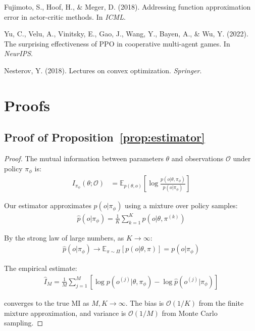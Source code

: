 \documentclass[12pt, a4paper]{article}
\begin{document}
\begin{thebibliography}{99}
Fujimoto, S., Hoof, H., \& Meger, D. (2018). Addressing function approximation error in actor-critic methods. In \textit{ICML}.

Yu, C., Velu, A., Vinitsky, E., Gao, J., Wang, Y., Bayen, A., \& Wu, Y. (2022). The surprising effectiveness of PPO in cooperative multi-agent games. In \textit{NeurIPS}.

Nesterov, Y. (2018). Lectures on convex optimization. \textit{Springer}.

\end{thebibliography}

\appendix

\section{Proofs}

\subsection{Proof of Proposition~\ref{prop:estimator}}

\begin{proof}
The mutual information between parameters $\theta$ and observations $\mathcal{O}$ under policy $\pi_\phi$ is:
\begin{align}
I_{\pi_\phi}(\theta; \mathcal{O}) &= \mathbb{E}_{p(\theta, o)}\left[\log \frac{p(o|\theta, \pi_\phi)}{p(o|\pi_\phi)}\right]
\end{align}

Our estimator approximates $p(o|\pi_\phi)$ using a mixture over policy samples:
\begin{align}
\hat{p}(o|\pi_\phi) = \frac{1}{K} \sum_{k=1}^K p(o|\theta, \pi^{(k)})
\end{align}

By the strong law of large numbers, as $K \to \infty$:
\begin{align}
\hat{p}(o|\pi_\phi) \to \mathbb{E}_{\pi \sim \Pi}[p(o|\theta, \pi)] = p(o|\pi_\phi)
\end{align}

The empirical estimate:
\begin{align}
\hat{I}_M = \frac{1}{M} \sum_{j=1}^M \left[\log p(o^{(j)}|\theta, \pi_\phi) - \log \hat{p}(o^{(j)}|\pi_\phi)\right]
\end{align}

converges to the true MI as $M, K \to \infty$. The bias is $\mathcal{O}(1/K)$ from the finite mixture approximation, and variance is $\mathcal{O}(1/M)$ from Monte Carlo sampling.
\end{proof}
\end{document}
